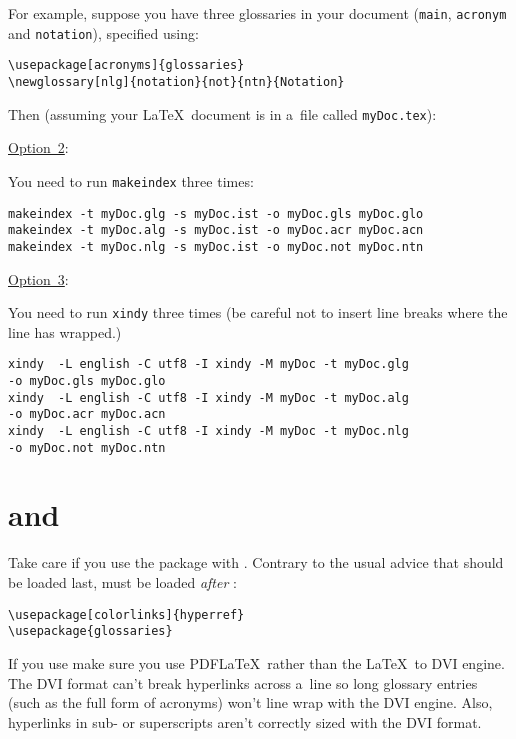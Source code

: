 \documentclass{nlctdoc}
\newcommand*{\opt}[1]{\hyperlink{option#1}{Option~#1}}
\begin{document}
For example, suppose you have three glossaries in your document
(\texttt{main}, \texttt{acronym} and \texttt{notation}), 
specified using:
\begin{verbatim}
\usepackage[acronyms]{glossaries}
\newglossary[nlg]{notation}{not}{ntn}{Notation}
\end{verbatim}
Then (assuming your \LaTeX\ document is in a~file called
\texttt{myDoc.tex}):

\begin{description}
\item\opt2:

You need to run \texttt{makeindex} three times:
\begin{verbatim}
makeindex -t myDoc.glg -s myDoc.ist -o myDoc.gls myDoc.glo
makeindex -t myDoc.alg -s myDoc.ist -o myDoc.acr myDoc.acn
makeindex -t myDoc.nlg -s myDoc.ist -o myDoc.not myDoc.ntn
\end{verbatim}

\item\opt3:\nopagebreak

You need to run \texttt{xindy} three times (be careful not to insert
line breaks where the line has wrapped.)
\begin{verbatim}
xindy  -L english -C utf8 -I xindy -M myDoc -t myDoc.glg
-o myDoc.gls myDoc.glo
xindy  -L english -C utf8 -I xindy -M myDoc -t myDoc.alg
-o myDoc.acr myDoc.acn
xindy  -L english -C utf8 -I xindy -M myDoc -t myDoc.nlg
-o myDoc.not myDoc.ntn
\end{verbatim}
\end{description}

\section[glossaries and hyperref]{ and }
\label{sec:hyperref}

Take care if you use the  package with
. Contrary to the usual advice that 
should be loaded last,  must be loaded \emph{after}
:
\begin{verbatim}
\usepackage[colorlinks]{hyperref}
\usepackage{glossaries}
\end{verbatim}
If you use  make sure you use PDF\LaTeX\ rather than
the \LaTeX\ to DVI engine. The DVI format can't break hyperlinks across
a~line so long glossary entries (such as the full form of acronyms)
won't line wrap with the DVI engine. Also, hyperlinks in sub- or
superscripts aren't correctly sized with the DVI format.
\end{document}
